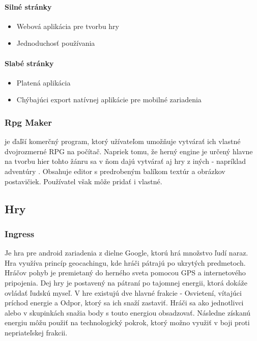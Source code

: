 \paragraph*{Silné stránky}
\begin{itemize}
  \item Webová aplikácia pre tvorbu hry
  \item Jednoduchosť používania
\end{itemize}
\paragraph*{Slabé stránky}
\begin{itemize}
  \item Platená aplikácia
  \item Chýbajúci export natívnej aplikácie pre mobilné zariadenia
\end{itemize}





\subsubsection{Rpg Maker} je ďaľší komerčný program, ktorý užívateľom umožňuje vytvárať ich vlastné dvojrozmerné RPG na počítač. Napriek tomu, že herný engine je určený hlavne na tvorbu hier tohto žánru sa v ňom dajú vytvárať aj hry z iných - napríklad adventúry \cite{rpg-maker-game}. Obsahuje editor s predrobeným balíkom textúr a obrázkov postavičiek. Používatel však môže pridať i vlastné. 
\cite{rpg-maker}

\subsection{Hry}


\subsubsection{Ingress} Je hra pre android zariadenia z dielne Google, ktorú hrá množstvo ľudí naraz. Hra využíva princíp geocachingu, kde hráči pátrajú po ukrytých predmetoch. Hráčov pohyb je premietaný do herného sveta pomocou GPS a internetového pripojenia. Dej hry je postavený na pátraní po tajomnej energii, ktorá dokáže ovládať ľudskú myseľ. V hre existujú dve hlavné frakcie - Osvietení, vítajúci príchod energie a Odpor, ktorý sa ich snaží zastaviť. Hráči sa ako jednotlivci alebo v skupinkách snažia body s touto energiou obsadzovať. Následne získanú energiu môžu použiť na technologický pokrok, ktorý možno využiť v boji proti nepriateľskej frakcii. 

